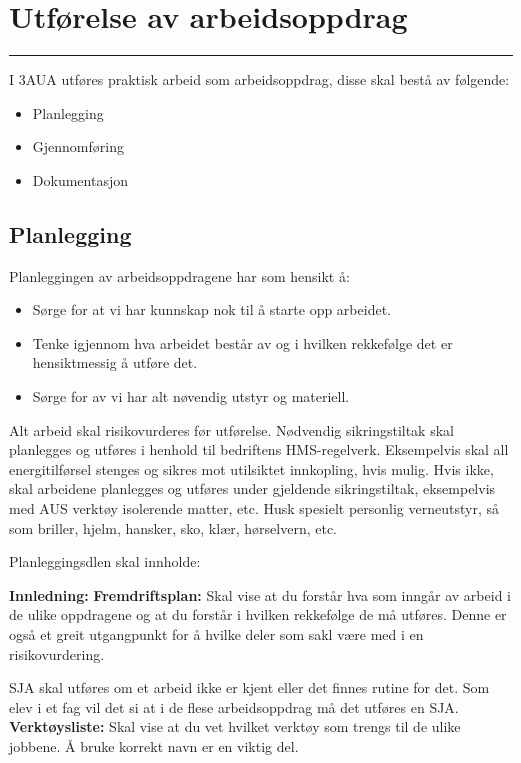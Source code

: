 
\section {Utførelse av arbeidsoppdrag}
\hrule

\vskip 1cm

I 3AUA utføres praktisk arbeid som arbeidsoppdrag, disse skal bestå av følgende:\begin{itemize}[noitemsep]
	\item Planlegging
	\item Gjennomføring
	\item Dokumentasjon
\end{itemize}

\subsection {Planlegging}

Planleggingen av arbeidsoppdragene har som hensikt å:

\begin{itemize}[noitemsep]
	\item Sørge for at vi har kunnskap nok til å starte opp arbeidet. 
	\item Tenke igjennom hva arbeidet består av og i hvilken rekkefølge det er hensiktmessig å utføre det. 
	\item Sørge for av vi har alt nøvendig utstyr og materiell. 
\end{itemize}



Alt arbeid skal risikovurderes før utførelse. Nødvendig sikringstiltak skal planlegges og utføres i henhold til bedriftens HMS-regelverk. Eksempelvis skal all energitilførsel stenges og sikres mot utilsiktet innkopling, hvis mulig. Hvis ikke, skal arbeidene planlegges og utføres under gjeldende sikringstiltak, eksempelvis med AUS verktøy isolerende matter, etc. Husk spesielt personlig verneutstyr, så som briller, hjelm, hansker, sko, klær, hørselvern, etc.

Planleggingsdlen skal innholde:

\textbf{Innledning:}
\vskip 10pt 
\vskip 10pt 
\textbf{Fremdriftsplan:}
\vskip 10pt 
Skal vise at du forstår hva som inngår av arbeid i de ulike oppdragene og at du forstår i hvilken rekkefølge de må utføres. Denne er også et greit utgangpunkt for å hvilke deler som sakl være med i en risikovurdering. 


\vskip 10pt 
SJA skal utføres om et arbeid ikke er kjent eller det finnes rutine for det. Som elev i et fag vil det si at i de flese arbeidsoppdrag må det utføres en SJA. 
\vskip 10pt 
\textbf{Verktøysliste:}
\vskip 10pt 
Skal vise at du vet hvilket verktøy som trengs til de ulike jobbene. Å bruke korrekt navn er en viktig del. 


